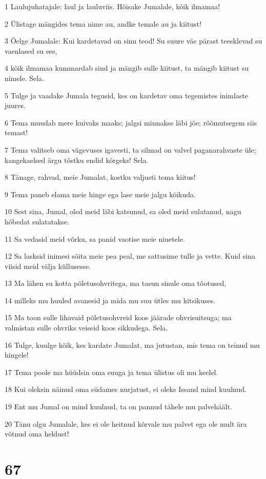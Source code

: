 \par 1 Laulujuhatajale: laul ja lauluviis. Hõisake Jumalale, kõik ilmamaa!
\par 2 Ülistage mängides tema nime au, andke temale au ja kiitust!
\par 3 Öelge Jumalale: Kui kardetavad on sinu teod! Su suure väe pärast teesklevad su vaenlased su ees,
\par 4 kõik ilmamaa kummardab sind ja mängib sulle kiitust, ta mängib kiitust su nimele. Sela.
\par 5 Tulge ja vaadake Jumala tegusid, kes on kardetav oma tegemistes inimlaste juures.
\par 6 Tema muudab mere kuivaks maaks; jalgsi minnakse läbi jõe; rõõmutsegem siis temast!
\par 7 Tema valitseb oma vägevuses igavesti, ta silmad on valvel paganarahvaste üle; kangekaelsed ärgu tõstku endid kõrgeks! Sela.
\par 8 Tänage, rahvad, meie Jumalat, kostku valjusti tema kiitus!
\par 9 Tema paneb elama meie hinge ega lase meie jalgu kõikuda.
\par 10 Sest sina, Jumal, oled meid läbi katsunud, sa oled meid sulatanud, nagu hõbedat sulatatakse.
\par 11 Sa vedasid meid võrku, sa panid vaotise meie niuetele.
\par 12 Sa lasksid inimesi sõita meie pea peal, me sattusime tulle ja vette. Kuid sina viisid meid välja küllusesse.
\par 13 Ma lähen su kotta põletusohvritega, ma tasun sinule oma tõotused,
\par 14 milleks mu huuled avanesid ja mida mu suu ütles mu kitsikuses.
\par 15 Ma toon sulle lihavaid põletusohvreid koos jäärade ohvrisuitsuga; ma valmistan sulle ohvriks veiseid koos sikkudega. Sela.
\par 16 Tulge, kuulge kõik, kes kardate Jumalat, ma jutustan, mis tema on teinud mu hingele!
\par 17 Tema poole ma hüüdsin oma suuga ja tema ülistus oli mu keelel.
\par 18 Kui oleksin näinud oma südames nurjatust, ei oleks Issand mind kuulnud.
\par 19 Ent mu Jumal on mind kuulnud, ta on pannud tähele mu palvehäält.
\par 20 Tänu olgu Jumalale, kes ei ole heitnud kõrvale mu palvet ega ole mult ära võtnud oma heldust!

\chapter{67}

